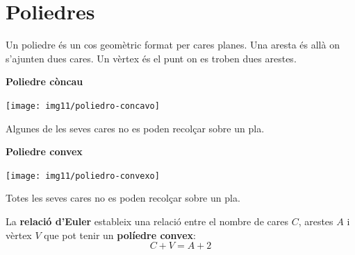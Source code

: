 \pagebreak

\section{ Poliedres }

\begin{theorybox}
 Un poliedre és un cos geomètric format per cares planes. Una aresta és allà on s'ajunten dues cares. Un vèrtex és el punt on es troben dues arestes.

 \begin{multicols}{2}
 	 	\centering
 	 \textbf{Poliedre còncau}
 	
 	\texttt{[image: img11/poliedro-concavo]}
 	
  {\scriptsize	Algunes de les seves cares no es poden recolçar sobre un pla.}
 	
 	\textbf{Poliedre convex}
 		
 	\texttt{[image: img11/poliedro-convexo]}
 	
 	{\scriptsize	Totes les seves cares no es poden recolçar sobre un pla.}
 \end{multicols}
	
 La \textbf{relació d'Euler} estableix una relació entre el nombre de cares ${C}$, arestes $A$ i vèrtex $V$ que pot tenir un \textbf{políedre convex}:	
 \[C+V=A+2\]
 
\end{theorybox}


